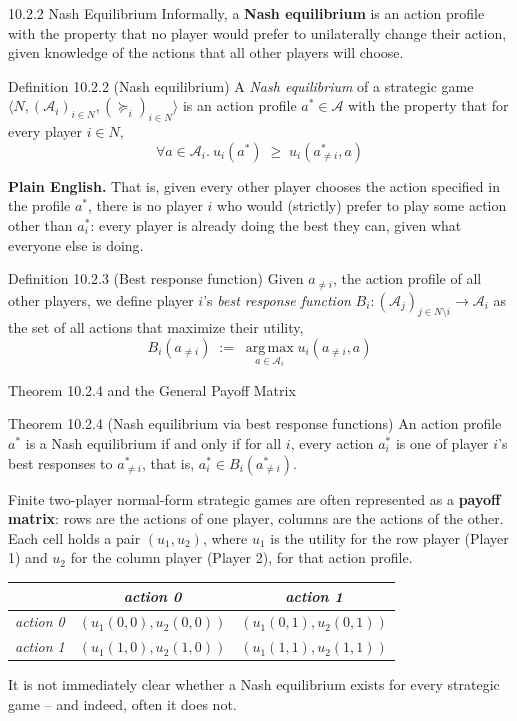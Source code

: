 \documentclass[aspectratio=169,10pt]{beamer}
\newcommand{\Ac}{\mathcal{A}}
\begin{document}
\begin{frame}{10.2.2 Nash Equilibrium}
  Informally, a \textbf{Nash equilibrium} is an action profile with the
  property that no player would prefer to unilaterally change their
  action, given knowledge of the actions that all other players will
  choose.

  \begin{block}{Definition 10.2.2 (Nash equilibrium)}
    A \emph{Nash equilibrium} of a strategic game
    $\langle N,(\Ac_i)_{i\in N},(\succeq_i)_{i\in N}\rangle$ is an action
    profile $a^*\in\Ac$ with the property that for every player $i\in N$,
    \[
      \forall a\in\Ac_i.\ u_i(a^*) \;\geq\; u_i(a^*_{\neq i},a)
    \]
  \end{block}
  \textbf{Plain English.} That is, given every other player chooses the
  action specified in the profile $a^*$, there is no player $i$ who would
  (strictly) prefer to play some action other than $a_i^*$: every player
  is already doing the best they can, given what everyone else is doing.

  \begin{block}{Definition 10.2.3 (Best response function)}
    Given $a_{\neq i}$, the action profile of all other players, we define
    player $i$'s \emph{best response function}
    $B_i:(\Ac_j)_{j\in N\setminus i}\to\Ac_i$ as the set of all actions
    that maximize their utility,
    \[
      B_i(a_{\neq i}) \;:=\; \operatorname*{arg\,max}_{a\in\Ac_i} u_i(a_{\neq i},a)
    \]
  \end{block}
\end{frame}

\begin{frame}{Theorem 10.2.4 and the General Payoff Matrix}
  \begin{block}{Theorem 10.2.4 (Nash equilibrium via best response functions)}
    An action profile $a^*$ is a Nash equilibrium if and only if for all
    $i$, every action $a_i^*$ is one of player $i$'s best responses to
    $a^*_{\neq i}$, that is, $a_i^*\in B_i(a^*_{\neq i})$.
  \end{block}

  \vspace{0.3em}
  Finite two-player normal-form strategic games are often represented as a
  \textbf{payoff matrix}: rows are the actions of one player, columns are
  the actions of the other. Each cell holds a pair $(u_1,u_2)$, where
  $u_1$ is the utility for the row player (Player 1) and $u_2$ for the
  column player (Player 2), for that action profile.
  \begin{center}
  \begin{tabular}{c|c|c}
    & \emph{action 0} & \emph{action 1} \\ \hline
    \emph{action 0} & $(u_1(0,0),u_2(0,0))$ & $(u_1(0,1),u_2(0,1))$ \\ \hline
    \emph{action 1} & $(u_1(1,0),u_2(1,0))$ & $(u_1(1,1),u_2(1,1))$
  \end{tabular}
  \end{center}
  It is not immediately clear whether a Nash equilibrium exists for every
  strategic game -- and indeed, often it does not.
\end{frame}
\end{document}
